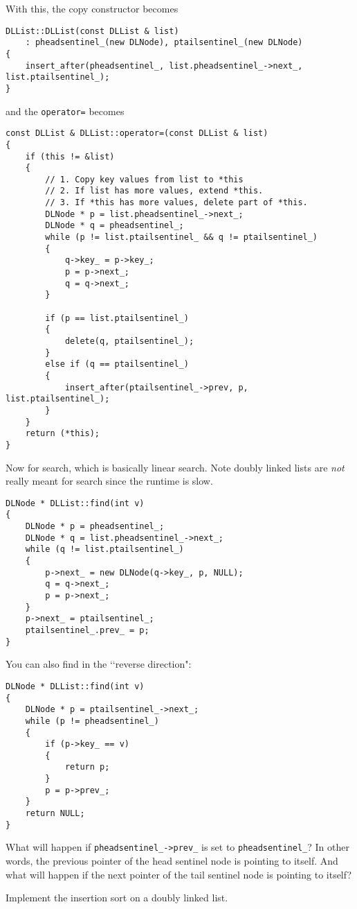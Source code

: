 With this,
the copy constructor becomes
\begin{Verbatim}[frame=single,fontsize=\footnotesize]
DLList::DLList(const DLList & list)
    : pheadsentinel_(new DLNode), ptailsentinel_(new DLNode)
{
    insert_after(pheadsentinel_, list.pheadsentinel_->next_, list.ptailsentinel_);
}
\end{Verbatim}
and the \verb!operator=! becomes
\begin{Verbatim}[frame=single,fontsize=\footnotesize]
const DLList & DLList::operator=(const DLList & list)
{
    if (this != &list)
    {
        // 1. Copy key values from list to *this
        // 2. If list has more values, extend *this.
        // 3. If *this has more values, delete part of *this.
        DLNode * p = list.pheadsentinel_->next_;
        DLNode * q = pheadsentinel_;
        while (p != list.ptailsentinel_ && q != ptailsentinel_)
        {
            q->key_ = p->key_;
            p = p->next_;
            q = q->next_;
        }

        if (p == list.ptailsentinel_)
        {
            delete(q, ptailsentinel_);
        }
        else if (q == ptailsentinel_)
        {
            insert_after(ptailsentinel_->prev, p, list.ptailsentinel_);
        }
    }
    return (*this);
}
\end{Verbatim}

Now for search, which is basically linear search.
Note doubly linked lists are \textit{not} really meant for search since the runtime is slow.
\begin{Verbatim}[frame=single,fontsize=\footnotesize]
DLNode * DLList::find(int v)
{
    DLNode * p = pheadsentinel_;
    DLNode * q = list.pheadsentinel_->next_;
    while (q != list.ptailsentinel_)
    {
        p->next_ = new DLNode(q->key_, p, NULL);
        q = q->next_;
        p = p->next_;
    }
    p->next_ = ptailsentinel_;
    ptailsentinel_.prev_ = p;
}
\end{Verbatim}
You can also find in the \lq\lq reverse direction":
\begin{Verbatim}[frame=single,fontsize=\footnotesize]
DLNode * DLList::find(int v)
{
    DLNode * p = ptailsentinel_->next_;
    while (p != pheadsentinel_)
    {
        if (p->key_ == v)
        {
            return p;
        }
        p = p->prev_;
    }
    return NULL;
}
\end{Verbatim}



\begin{ex}
  What will happen if \verb!pheadsentinel_->prev_! is set to
  \verb!pheadsentinel_!? In other words, the previous
  pointer of the head sentinel node is pointing to itself.
  And what will happen if the next pointer of the tail sentinel node
  is pointing to itself?
\end{ex}



\begin{ex}
  Implement the insertion sort on a doubly linked list.
\end{ex}

